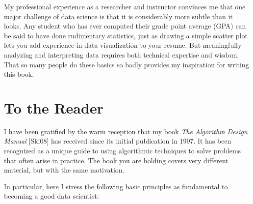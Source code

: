 \documentclass[10pt]{article}
\begin{document}
My professional experience as a researcher and instructor convinces me that one major challenge of data science is that it is considerably more subtle than it looks. Any student who has ever computed their grade point average (GPA) can be said to have done rudimentary statistics, just as drawing a simple scatter plot lets you add experience in data visualization to your resume. But meaningfully analyzing and interpreting data requires both technical expertise and wisdom. That so many people do these basics so badly provides my inspiration for writing this book.

\section*{To the Reader}
I have been gratified by the warm reception that my book \textit{The Algorithm Design Manual} [Ski08] has received since its initial publication in 1997. It has been recognized as a unique guide to using algorithmic techniques to solve problems that often arise in practice. The book you are holding covers very different material, but with the same motivation.

In particular, here I stress the following basic principles as fundamental to becoming a good data scientist:
\end{document}
